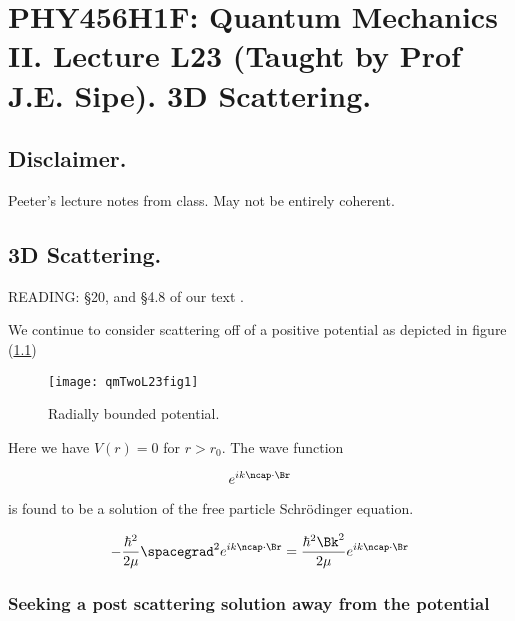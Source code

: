 
%

\chapter{PHY456H1F: Quantum Mechanics II.  Lecture L23 (Taught by Prof J.E. Sipe).  3D Scattering.}
\label{chap:qmTwoL23}
{}
\date{Nov 30, 2011}

\beginArtWithToc

\section{Disclaimer.}

Peeter's lecture notes from class.  May not be entirely coherent.

\section{3D Scattering.}

READING: \S 20, and \S 4.8 of our text \cite{desai2009quantum}.

We continue to consider scattering off of a positive potential as depicted in figure (\ref{fig:qmTwoL23:qmTwoL23fig1})
\begin{figure}[htp]
   \centering
   \texttt{[image: qmTwoL23fig1]}
   \caption{Radially bounded potential.}\label{fig:qmTwoL23:qmTwoL23fig1}
\end{figure}

Here we have $V(r) = 0$ for $r > r_0$.  The wave function

\begin{equation}\label{eqn:qmTwoL23:20}
e^{i k \ncap \cdot \Br}
\end{equation}

is found to be a solution of the free particle Schr\"{o}dinger equation.

\begin{equation}\label{eqn:qmTwoL23:40}
- \frac{\hbar^2}{2\mu} \spacegrad^2
e^{i k \ncap \cdot \Br}
 = \frac{\hbar^2 \Bk^2}{2 \mu}
e^{i k \ncap \cdot \Br}
\end{equation}

\subsection{Seeking a post scattering solution away from the potential}

